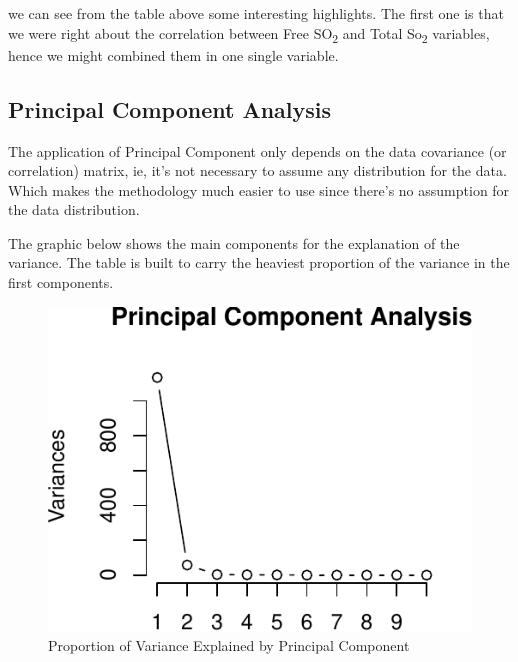 \documentclass[]{article}
\begin{document}
we can see from the table above some interesting highlights. The first
one is that we were right about the correlation between Free
SO\textsubscript{2} and Total So\textsubscript{2} variables, hence we
might combined them in one single variable.

\subsection{Principal Component
Analysis}\label{principal-component-analysis}

The application of Principal Component only depends on the data
covariance (or correlation) matrix, ie, it's not necessary to assume any
distribution for the data. Which makes the methodology much easier to
use since there's no assumption for the data distribution.\cite{pca}

The graphic below shows the main components for the explanation of the
variance. The table is built to carry the heaviest proportion of the
variance in the first components.

\begin{figure}[htbp]
\centering
\includegraphics{./Project_files/figure-latex/unnamed-chunk-11-1.pdf}
\caption{Proportion of Variance Explained by Principal Component}
\end{figure}
\end{document}
